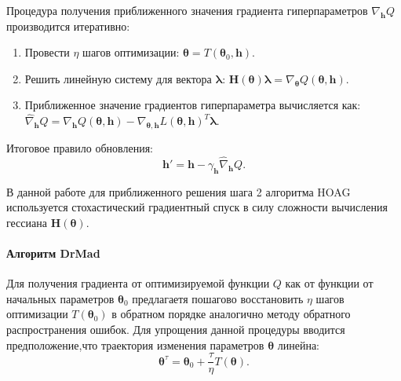\documentclass[12pt]{article}
\begin{document}
Процедура получения приближенного значения градиента гиперпараметров $\nabla_{\mathbf{h}} Q$  производится итеративно:
\begin{enumerate}
\item Провести $\eta$ шагов оптимизации: $\boldsymbol{\theta} = T(\boldsymbol{\theta}_0, \mathbf{h})$.
\item Решить линейную систему для вектора $\boldsymbol{\lambda}$: $\mathbf{H}(\boldsymbol{\theta})\boldsymbol{\lambda} =  \nabla_{\boldsymbol{\theta}} Q(\boldsymbol{\theta}, \mathbf{h})$.
\item Приближенное значение градиентов гиперпараметра вычисляется как: $\hat{\nabla}_{\mathbf{h}}Q = \nabla_{\mathbf{h}}Q(\boldsymbol{\theta}, \mathbf{h}) -\nabla_{\boldsymbol{\theta}, \mathbf{h}} L(\boldsymbol{\theta}, \mathbf{h})^T\boldsymbol{\lambda}$.
\end{enumerate}

Итоговое правило обновления:
\begin{equation}
\label{eq:update_hyper}
\mathbf{h}' = \mathbf{h} - \gamma_{\mathbf{h}} \hat{\nabla}_{\mathbf{h}}Q.
\end{equation}

В данной работе для приближенного решения  шага 2 алгоритма HOAG используется стохастический градиентный спуск в силу сложности вычисления гессиана $\mathbf{H}(\boldsymbol{\theta})$.


\paragraph{Алгоритм DrMad}

Для получения градиента от оптимизируемой функции $Q$ как от функции от начальных параметров $\boldsymbol{\theta}_0$ предлагаетя пошагово восстановить $\eta$ шагов оптимизации $T(\boldsymbol{\theta}_0)$ в обратном порядке аналогично методу обратного распространения ошибок. Для упрощения данной процедуры вводится предположение,что траектория изменения параметров $\boldsymbol{\theta}$ линейна:
\begin{equation}
\label{eq:mad_lin}
\boldsymbol{\theta}^\tau = \boldsymbol{\theta}_0 + \frac{\tau}{\eta} T(\boldsymbol{\theta}).
\end{equation}
\end{document}
